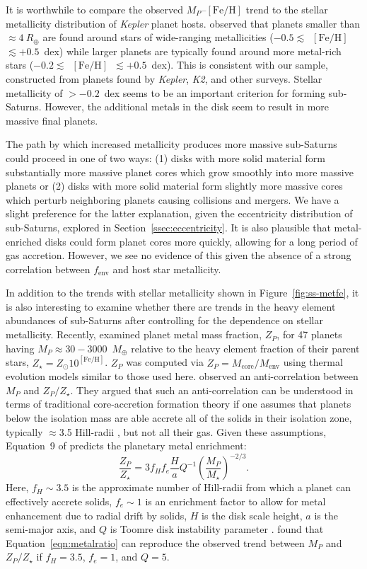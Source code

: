 \documentclass[preprint2]{aastex6}
\newcommand{\Kepler}{\textit{Kepler}\xspace}
\newcommand{\ktwo}{\textit{K2}\xspace}
\newcommand{\Mstar}{\ensuremath{M_{\star}}\xspace}
\newcommand{\fe}{\ensuremath{\mathrm{[Fe/H]}}\xspace}
\newcommand{\Mp}{\ensuremath{M_{P}}\xspace}
\newcommand{\Mcore}{\ensuremath{M_{\mathrm{core}}}\xspace}
\newcommand{\Menv}{\ensuremath{M_{\mathrm{env}}}\xspace}
\newcommand{\fenv}{\ensuremath{f_{\mathrm{env}}}\xspace}
\newcommand{\Me}{\ensuremath{M_{\oplus}}\xspace}
\renewcommand{\Re}{\ensuremath{R_{\oplus}}\xspace}
\begin{document}
It is worthwhile to compare the observed \Mp--\fe trend to the stellar metallicity distribution of \Kepler planet hosts. \cite{buchhave:2012} observed that planets smaller than $\approx4~\Re$ are found around stars of wide-ranging metallicities ($-0.5 \lesssim$~\fe~$\lesssim+0.5$~dex) while larger planets are typically found around more metal-rich stars ($-0.2 \lesssim$~\fe~$\lesssim+0.5$~dex). This is consistent with our sample, constructed from planets found by \Kepler, \ktwo, and other surveys. Stellar metallicity of $> -0.2$~dex seems to be an important criterion for forming sub-Saturns. However, the additional metals in the disk seem to result in more massive final planets.

The path by which increased metallicity produces more massive sub-Saturns could proceed in one of two ways: (1) disks with more solid material form substantially more massive planet cores which grow smoothly into more massive planets or (2) disks with more solid material form slightly more massive cores which perturb neighboring planets causing collisions and mergers. We have a slight preference for the latter explanation, given the eccentricity distribution of sub-Saturns, explored in Section~\ref{ssec:eccentricity}. It is also plausible that metal-enriched disks could form planet cores more quickly, allowing for a long period of gas accretion. However, we see no evidence of this given the absence of a strong correlation between \fenv and host star metallicity.

In addition to the trends with stellar metallicity shown in Figure~\ref{fig:ss-metfe}, it is also interesting to examine whether there are trends in the heavy element abundances of sub-Saturns after controlling for the dependence on stellar metallicity. Recently, \citet{Thorngren16} examined planet metal mass fraction, $Z_P$, for 47 planets having $\Mp \approx 30-3000$~\Me relative to the heavy element fraction of their parent stars, $Z_\star = Z_{\odot}10^\fe$. $Z_P$ was computed via $Z_P = \Mcore/\Menv$ using thermal evolution models similar to those used here. \cite{Thorngren16} observed an anti-correlation between \Mp and $Z_P/Z_{\star}$. They argued that such an anti-correlation can be understood in terms of traditional core-accretion formation theory if one assumes that planets below the isolation mass are able accrete all of the solids in their isolation zone, typically $\approx$3.5 Hill-radii \citep{Lissauer93}, but not all their gas. Given these assumptions, Equation~9 of \citet{Thorngren16} predicts the planetary metal enrichment:
%
\begin{equation}
\label{eqn:metalratio}
\frac{Z_P}{Z_\star} = 3 f_H f_e \frac{H}{a}Q^{-1}\left(\frac{\Mp}{\Mstar}\right)^{-2/3}.
\end{equation}
%
Here, $f_H\sim3.5$ is the approximate number of Hill-radii from which a planet can effectively accrete solids, $f_e\sim1$ is an enrichment factor to allow for metal enhancement due to radial drift by solids, $H$ is the disk scale height, $a$ is the semi-major axis, and $Q$ is Toomre disk instability parameter \citep{Toomre64}. \citet{Thorngren16} found that Equation~\ref{eqn:metalratio} can reproduce the observed trend between \Mp and $Z_P/Z_\star$ if $f_H=3.5$, $f_e=1$, and $Q=5$.
\end{document}
